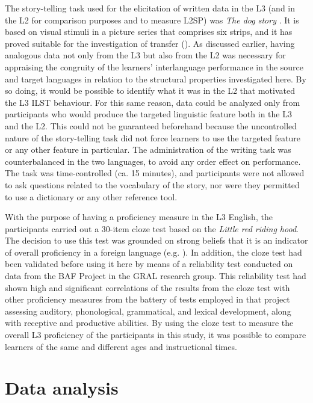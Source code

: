 \documentclass[output=paper,modfonts,nonflat, newtxmath]{langsci/langscibook}
\begin{document}
The story-telling task used for the elicitation of written data in the L3 (and in the L2 for comparison purposes and to measure L2SP) was \textit{The dog story} \citep{Heaton1966}. It is based on visual stimuli in a picture series that comprises six strips, and it has proved suitable for the investigation of transfer (\citealt{SánchezJarvis2008}). As discussed earlier, having analogous data not only from the L3 but also from the L2 was necessary for appraising the congruity of the learners’ interlanguage performance \citep[55]{Jarvis2000} in the source and target languages in relation to the structural properties investigated here. By so doing, it would be possible to identify what it was in the L2 that motivated the L3 ILST behaviour. For this same reason, data could be analyzed only from participants who would produce the targeted linguistic feature both in the L3 and the L2. This could not be guaranteed beforehand because the uncontrolled nature of the story-telling task did not force learners to use the targeted feature or any other feature in particular. The administration of the writing task was counterbalanced in the two languages,  to avoid any order effect on performance. The task was time-controlled (ca. 15 minutes), and participants were not allowed to ask questions related to the vocabulary of the story, nor were they permitted to use a dictionary or any other reference tool.

With the purpose of having a proficiency measure in the L3 English, the participants carried out a 30-item cloze test based on the \textit{Little red riding hood}. The decision to use this test was grounded on strong beliefs that it is an indicator of overall proficiency in a foreign language (e.g. \citealt{Hanzeli1977, KatonaDornyei1993}). In addition, the cloze test had been validated before using it here \citep{Muñoz2006} by means of a reliability test conducted on data from the BAF Project in the GRAL research group. This reliability test had shown high and significant correlations of the results from the cloze test with other proficiency measures from the battery of tests employed in that project assessing auditory, phonological, grammatical, and lexical development, along with receptive and productive abilities. By using the cloze test to measure the overall L3 proficiency of the participants in this study, it was possible to compare learners of the same and different ages and instructional times.

\section{Data analysis}
\end{document}
